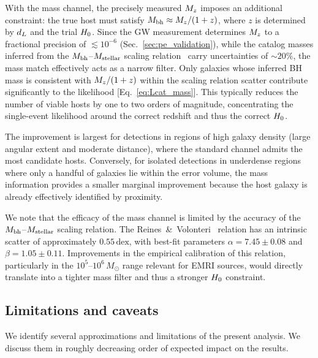 With the mass channel, the precisely measured $M_z$ imposes an
additional constraint: the true host must satisfy
$M_\mathrm{bh} \approx M_z / (1+z)$, where $z$ is determined by $d_L$ and the
trial $H_0$.  Since the GW measurement determines $M_z$ to a fractional
precision of $\lesssim 10^{-6}$ (Sec.~\ref{sec:pe_validation}), while
the catalog masses inferred from the $M_\mathrm{bh}$--$M_\mathrm{stellar}$ scaling
relation~\cite{Reines:2015moa} carry uncertainties of $\sim 20\%$, the
mass match effectively acts as a narrow filter.  Only galaxies whose
inferred BH mass is consistent with $M_z / (1+z)$ within the scaling
relation scatter contribute significantly to the likelihood
[Eq.~\eqref{eq:Lcat_mass}].  This typically reduces the number of viable
hosts by one to two orders of magnitude, concentrating the single-event
likelihood around the correct redshift and thus the correct $H_0$.

The improvement is largest for detections in regions of high galaxy
density (large angular extent and moderate distance), where the standard
channel admits the most candidate hosts.  Conversely, for isolated
detections in underdense regions where only a handful of galaxies lie
within the error volume, the mass information provides a smaller
marginal improvement because the host galaxy is already effectively
identified by proximity.

We note that the efficacy of the mass channel is limited by the accuracy
of the $M_\mathrm{bh}$--$M_\mathrm{stellar}$ scaling relation.  The
Reines~\&~Volonteri~\cite{Reines:2015moa} relation has an intrinsic
scatter of approximately $0.55\,\mathrm{dex}$, with best-fit parameters
$\alpha = 7.45 \pm 0.08$ and $\beta = 1.05 \pm 0.11$.  Improvements in
the empirical calibration of this relation, particularly in the
$10^5$--$10^6\,M_\odot$ range relevant for EMRI sources, would directly
translate into a tighter mass filter and thus a stronger $H_0$
constraint.

\subsection{Limitations and caveats}
\label{sec:caveats}

We identify several approximations and limitations of the present
analysis.  We discuss them in roughly decreasing order of expected
impact on the results.

